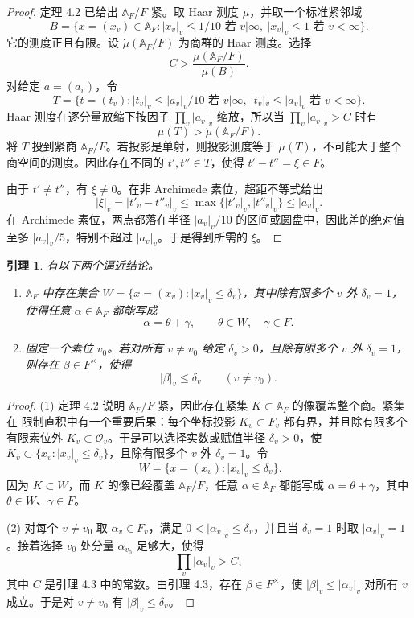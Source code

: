 \documentclass[11pt,a4paper,openany]{ctexbook}
\numberwithin{equation}{chapter}
\newcommand{\A}{\mathbb{A}}
\theoremstyle{plain}
\newtheorem{lemma}[theorem]{引理}
\theoremstyle{definition}
\theoremstyle{remark}
\begin{document}
\begin{proof}
定理 4.2 已给出 $\A_F/F$ 紧。取 Haar 测度 $\mu$，并取一个标准紧邻域
\[
 B=\{x=(x_v)\in\A_F: |x_v|_v\le 1/10\text{ 若 }v|\infty,\ |x_v|_v\le1\text{ 若 }v<\infty\}.
\]
它的测度正且有限。设 $\dot\mu(\A_F/F)$ 为商群的 Haar 测度。选择
\[
 C>\frac{\dot\mu(\A_F/F)}{\mu(B)}.
\]
对给定 $a=(a_v)$，令
\[
 T=\{t=(t_v): |t_v|_v\le |a_v|_v/10\text{ 若 }v|\infty,\ |t_v|_v\le |a_v|_v\text{ 若 }v<\infty\}.
\]
Haar 测度在逐分量放缩下按因子 $\prod_v|a_v|_v$ 缩放，所以当 $\prod_v|a_v|_v>C$ 时有
\[
 \mu(T)>\dot\mu(\A_F/F).
\]
将 $T$ 投到紧商 $\A_F/F$。若投影是单射，则投影测度等于 $\mu(T)$，不可能大于整个商空间的测度。因此存在不同的 $t',t''\in T$，使得 $t'-t''=\xi\in F$。

由于 $t'\ne t''$，有 $\xi\ne0$。在非 Archimede 素位，超距不等式给出
\[
 |\xi|_v=|t'_v-t''_v|_v\le \max\{|t'_v|_v,|t''_v|_v\}\le |a_v|_v.
\]
在 Archimede 素位，两点都落在半径 $|a_v|_v/10$ 的区间或圆盘中，因此差的绝对值至多 $|a_v|_v/5$，特别不超过 $|a_v|_v$。于是得到所需的 $\xi$。
\end{proof}

\begin{lemma}
有以下两个逼近结论。

\begin{enumerate}[label=(\arabic*)]
\item $\A_F$ 中存在集合 $W=\{x=(x_v): |x_v|_v\le\delta_v\}$，其中除有限多个 $v$ 外 $\delta_v=1$，使得任意 $\alpha\in\A_F$ 都能写成
\[
 \alpha=\theta+\gamma,\qquad \theta\in W,\quad \gamma\in F.
\]
\item 固定一个素位 $v_0$。若对所有 $v\ne v_0$ 给定 $\delta_v>0$，且除有限多个 $v$ 外 $\delta_v=1$，则存在 $\beta\in F^\times$，使得
\[
 |\beta|_v\le\delta_v\qquad(v\ne v_0).
\]
\end{enumerate}
\end{lemma}

\begin{proof}
(1) 定理 4.2 说明 $\A_F/F$ 紧，因此存在紧集 $K\subset\A_F$ 的像覆盖整个商。紧集在
限制直积中有一个重要后果：每个坐标投影 $K_v\subset F_v$ 都有界，并且除有限多个有限素位外
$K_v\subset\mathcal O_v$。于是可以选择实数或赋值半径 $\delta_v>0$，使
$K_v\subset\{x_v:|x_v|_v\le\delta_v\}$，且除有限多个 $v$ 外 $\delta_v=1$。令
\[
\ W=\{x=(x_v): |x_v|_v\le\delta_v\}.
\]
因为 $K\subset W$，而 $K$ 的像已经覆盖 $\A_F/F$，任意 $\alpha\in\A_F$ 都能写成
$\alpha=\theta+\gamma$，其中 $\theta\in W$、$\gamma\in F$。

(2) 对每个 $v\ne v_0$ 取 $\alpha_v\in F_v$，满足 $0<|\alpha_v|_v\le\delta_v$，并且当 $\delta_v=1$ 时取 $|\alpha_v|_v=1$。接着选择 $v_0$ 处分量 $\alpha_{v_0}$ 足够大，使得
\[
 \prod_v|\alpha_v|_v>C,
\]
其中 $C$ 是引理 4.3 中的常数。由引理 4.3，存在 $\beta\in F^\times$，使 $|\beta|_v\le|\alpha_v|_v$ 对所有 $v$ 成立。于是对 $v\ne v_0$ 有 $|\beta|_v\le\delta_v$。
\end{proof}
\end{document}
